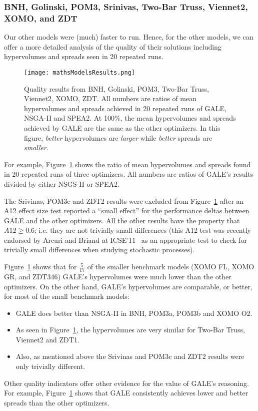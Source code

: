 \documentclass[10pt,journal,compsoc]{IEEEtran}
\newcommand{\bi}{\begin{itemize}}
\newcommand{\ei}{\end{itemize}}
\newcommand{\fig}[1]{Figure~\ref{fig:#1}}
\begin{document}
 
\subsubsection{BNH, Golinski, POM3, 
Srinivas, 
Two-Bar Truss, Viennet2, XOMO, and ZDT}

Our other models   were (much)
faster to run.  Hence, for  the other models, we
can offer a more detailed analysis of the quality of
their solutions including hypervolumes and spreads
seen in 20 repeated runs.
\begin{figure}
\texttt{[image: mathsModelsResults.png]}
\caption{Quality results from BNH, Golinski, POM3, Two-Bar Truss, Viennet2, XOMO, ZDT.
All numbers are ratios of mean hypervolumes and spreads achieved in 20 repeated runs of GALE, NSGA-II and SPEA2.
At 100\%, the mean hypervolumes and spreads achieved by GALE are the same as the other optimizers.
In this figure,  {\em better} hypervolumes are {\em larger} while {\em better} spreads are {\em smaller}.}\label{fig:rmodels}
\end{figure}

For example, \fig{rmodels} shows the ratio of mean hypervolumes 
and spreads found in 20 repeated runs of three optimizers. All numbers are ratios of GALE's results divided
by either NSGS-II or SPEA2.  

The Srivinas, POM3c and ZDT2 results were
excluded from \fig{rmodels} after an A12 effect size test
reported a ``small effect'' for the performance deltas between GALE and the other optimizers.
All the other results have the property that $\mathit{A12} \ge 0.6$; i.e. they are not trivially small
differences
  (this A12
  test was recently endorsed by Arcuri and
  Briand at ICSE'11~\cite{arcuri11} as an
  appropriate test to check for trivially small
  differences when studying stochastic processes).

\fig{rmodels} shows that for $\frac{5}{17}$
of the smaller benchmark models (XOMO FL, XOMO GR, and
ZDT346) GALE's hypervolumes were much lower than the
other optimizers.  On the other hand, GALE's
hypervolumes are comparable, or better, for most of
the small benchmark models: \bi
\item
GALE does better than NSGA-II in BNH, POM3a, POM3b and XOMO
O2.
\item As seen in 
\fig{rmodels}, the hypervolumes are very similar for Two-Bar Truss,
Viennet2 and ZDT1.  
\item
Also, as mentioned
above the Srivinas and POM3c and ZDT2 results were only trivially different.
\ei
Other quality indicators offer other evidence for
the
value of GALE's reasoning. For example, \fig{rmodels} shows that GALE
consistently achieves lower and better spreads than the other optimizers.
\end{document}
